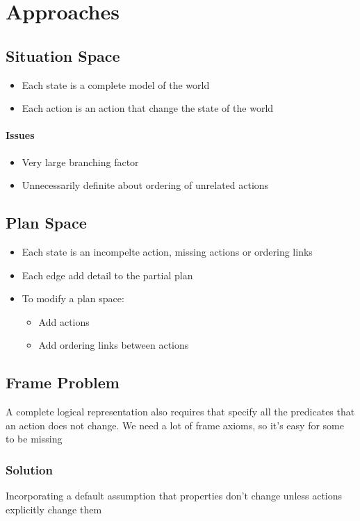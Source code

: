 \section{Approaches}

  \subsection{Situation Space}

    \begin{itemize}
      \item Each state is a complete model of the world
      \item Each action is an action that change the state of the world
    \end{itemize}

    \paragraph{Issues}
    \begin{itemize}
      \item Very large branching factor
      \item Unnecessarily definite about ordering of unrelated actions
    \end{itemize}

  \subsection{Plan Space}

    \begin{itemize}
      \item Each state is an incompelte action, missing actions or ordering
      links
      \item Each edge add detail to the partial plan
      \item To modify a plan space:
      \begin{itemize}
        \item Add actions
        \item Add ordering links between actions
      \end{itemize}
    \end{itemize}

  \subsection{Frame Problem}

    A complete logical representation also requires
     that specify all the predicates that an action does
    not change. We need a lot of frame axioms, so it's easy for some to be missing

    \subsubsection{Solution}

      Incorporating a default assumption that properties don't
      change unless actions explicitly change them